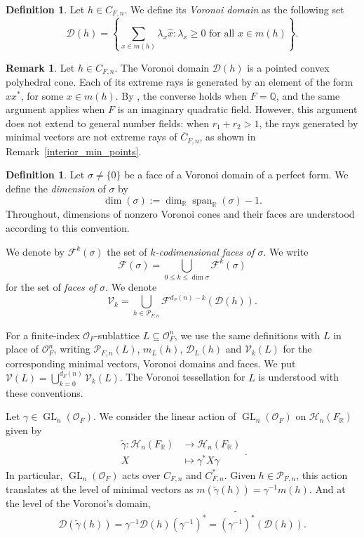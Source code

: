 \documentclass[11pt,a4paper,twoside]{amsart}
\theoremstyle{plain}
\theoremstyle{definition}
\newtheorem{definition}[theorem]{\bfseries Definition}
\newtheorem{remark}[theorem]{\bfseries Remark}
\newcommand{\rint}[0]{\mathcal{O}_F}
\newcommand{\kfacets}[0]{\mathcal{F}^k(\sigma)}
\newcommand{\perfect}[0]{\mathcal{P}_}
\newcommand{\GLo}[0]{\operatorname{GL}_n({\mathcal{O}_F})}
\newcommand{\Her}[0]{\mathcal{H}_n(\fr)}
\newcommand{\fr}[0]{F_\mathbb{R}}
\renewcommand{\leq}{\leqslant}
\renewcommand{\geq}{\geqslant}
\begin{document}
\begin{definition}
Let $h\in C_{F,n}$. We define its \textit{Voronoi domain} as the following set
$$\mathcal{D}(h) = \left\{ \sum_{x\in m(h)} \lambda_x \hat x : \lambda_x \geq 0 \text{ for all } x\in m(h) \right\}.$$
\end{definition}

\begin{remark}
Let $h\in C_{F,n}$. The Voronoi domain $\mathcal{D}(h)$ is a pointed convex polyhedral cone. Each of its extreme rays is generated by an element of the form $xx^*$, for some $x\in m(h)$. By \cite[Theorem~8]{Jaquet_rank_7}, the converse holds when
$F=\mathbb{Q}$, and the same argument applies when $F$ is
an imaginary quadratic field. However, this argument does not extend to general number fields:
when $r_1+r_2>1$, the rays generated by minimal vectors are
not extreme rays of $\overline{C}_{F,n}$, as shown in
Remark~\ref{interior_min_points}.
\end{remark}


\begin{definition}
Let $\sigma \neq \{0\}$ be a face of a Voronoi domain
of a perfect form. We define the \textit{dimension} of $\sigma$ by
$$
\dim(\sigma) := \dim_{\mathbb{R}}
\operatorname{span}_{\mathbb{R}}(\sigma) - 1.
$$
Throughout, dimensions of nonzero Voronoi cones and their
faces are understood according to this convention.

 We denote by 
$\kfacets$ the set of \textit{$k$-codimensional faces of $\sigma$}. 
We write $$\mathcal{F}(\sigma)=\bigcup_{0\leq k\leq \dim \sigma} \kfacets$$ for the set of \textit{faces of $\sigma$}.
We denote 
$$\mathcal{V}_k = \bigcup_{h\in \perfect{F,n}} \mathcal{F}^{d_F(n)-k}(\mathcal{D}(h)).$$

 For a finite-index $\rint$-sublattice $L\subseteq\rint^n$, we use the same definitions with $L$ in place of $\rint^n$, writing $\mathcal{P}_{F,n}(L)$, $m_L(h)$, $\mathcal{D}_L(h)$ and $\mathcal{V}_k(L)$ for the corresponding minimal vectors, Voronoi domains and faces. We put $\mathcal{V}(L)=\bigcup_{k=0}^{d_F(n)}\mathcal{V}_k(L)$. The Voronoi tessellation for $L$ is understood with these conventions.
\end{definition}

Let $\gamma \in \GLo$. We consider the linear action of $\GLo$ on $\Her$ given by
\begin{equation}
\label{action}
    \begin{aligned}
\tilde{\gamma} \colon \Her &\to \Her \\
X&\mapsto \gamma^*  X \gamma
\end{aligned}.
\end{equation}
In particular, $\GLo$ acts over $C_{F,n}$ and $C_{F,n}^*$. Given $h \in \perfect{F, n}$, this action translates at the level of minimal vectors as
$
m(\tilde{\gamma}(h)) = \gamma^{-1} m(h).
$
And at the level of the Voronoi's domain,
\begin{equation}
\label{real_action}
\mathcal{D}(\tilde{\gamma}(h)) = \gamma^{-1} \mathcal{D}(h) (\gamma^{-1})^*= \widetilde{(\gamma^{-1})^*}\left(\mathcal{D}(h)\right).
\end{equation}
\end{document}
